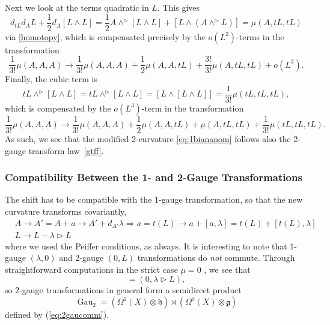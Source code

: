 \documentclass[onecolumn]{article}
\theoremstyle{theorem}
\theoremstyle{remark}
\theoremstyle{example}
\theoremstyle{definition}
\numberwithin{equation}{section}
\begin{document}
Next we look at the terms quadratic in $L$. This gives
\begin{equation}
    d_{tL}d_AL+\frac{1}{2}d_A[L\wedge L] = \frac{1}{2}A\wedge^\rhd[L\wedge L] + [L\wedge (A\wedge^\rhd L)] = \mu(A,tL,tL)\nonumber
\end{equation}
via  \eqref{homotopy}, which is compensated precisely by the $o(L^2)$-terms in the transformation
\begin{equation}
    \frac{1}{3!}\mu(A,A,A)\rightarrow \frac{1}{3!}\mu(A,A,A)+\frac{1}{2}\mu(A,A,tL) + \frac{3!}{3!}\mu(A,tL,tL) + o(L^3).\nonumber
\end{equation}
{Finally,} the cubic term is
\begin{equation}
    tL\wedge^\rhd[L\wedge L] = tL\wedge^\rhd [L\wedge L] = [L\wedge [L\wedge L]] = \frac{1}{3!}\mu(tL,tL,tL),\nonumber
\end{equation}
which is compensated by the $o(L^3)$-term in the transformation
\begin{equation}
     \frac{1}{3!}\mu(A,A,A)\rightarrow \frac{1}{3!}\mu(A,A,A)+\frac{1}{2}\mu(A,A,tL) + \mu(A,tL,tL) + \frac{1}{3!}\mu(tL,tL,tL).\nonumber
\end{equation}
{As} such, we see that the modified 2-curvature  \eqref{eq:1biananom} follows also the 2-gauge transform law~\eqref{gtff}.





\subsubsection{Compatibility Between the 1- and 2-Gauge Transformations}
The shift has to be compatible with the 1-gauge transformation, so that the new curvature transforms covariantly,
\begin{align}
&A \rightarrow A'= A+ a  \rightarrow A' + d_{A'}\lambda \Rightarrow  a = t(L)\rightarrow a + [a,\lambda] = t(L) + [t(L),\lambda] \\
& L \rightarrow L - \lambda \rhd  L
\end{align}
where we used the Peiffer conditions, as always. It is interesting to note that 1-gauge $(\lambda,0)$ and 2-gauge $(0,L)$ transformations do {\it {not}} commute. Through straightforward computations in the strict case $\mu=0$ \cite{Kapustin:2013uxa,Martins:2010ry,Radenkovic:2019qme}, we see that
\begin{equation}
    [(\lambda,0),(0,L)] = (0,\lambda\rhd L),\label{eq:2gaucomm}
\end{equation}
so 2-gauge transformations in general form a semidirect product \cite{Bullivant:2016clk,Martins:2010ry}
\begin{equation}
    \operatorname{Gau}_2 = (\Omega^1(X)\otimes\mathfrak{h})\rtimes(\Omega^0(X)\otimes\mathfrak{g})\nonumber
\end{equation}
defined by  (\ref{eq:2gaucomm}). 
\end{document}
